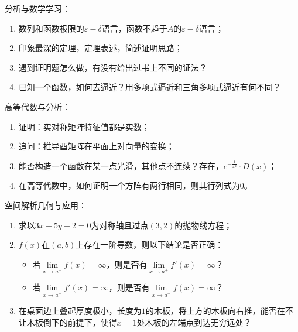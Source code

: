 \begin{example}[问题组4]分析与数学学习：
\begin{enumerate}
    \item 数列和函数极限的$\varepsilon-\delta$语言，函数不趋于$A$的$\varepsilon-\delta$语言；
    \item 印象最深的定理，定理表述，简述证明思路；
    \item 遇到证明题怎么做，有没有给出过书上不同的证法？
    \item 已知一个函数，如何去逼近？用多项式逼近和三角多项式逼近有何不同？
\end{enumerate}
\end{example}

\begin{example}[问题组5]高等代数与分析：
\begin{enumerate}
    \item 证明：实对称矩阵特征值都是实数；
    \item 追问：推导酉矩阵在平面上对向量的变换；
    \item 能否构造一个函数在某一点光滑，其他点不连续？存在，$e^{-\frac{1}{x^2}}\cdot D(x)$；
    \item 在高等代数中，如何证明一个方阵有两行相同，则其行列式为$0$。
\end{enumerate}
\end{example}

\begin{example}[问题组6]空间解析几何与应用：
\begin{enumerate}
    \item 求以$3x-5y+2=0$为对称轴且过点$(3,2)$的抛物线方程；
    \item $f(x)$在$(a,b)$上存在一阶导数，则以下结论是否正确：
    \begin{itemize}
        \item 若$\lim\limits_{x\to a^+}f(x)=\infty$，则是否有$\lim\limits_{x\to a^+}f'(x)=\infty$？
        \item 若$\lim\limits_{x\to a^+}f'(x)=\infty$，则是否有$\lim\limits_{x\to a^+}f(x)=\infty$？
    \end{itemize}
    \item 在桌面边上叠起厚度极小，长度为$1$的木板，将上方的木板向右推，能否在不让木板倒下的前提下，使得$x=1$处木板的左端点到达无穷远处？
\end{enumerate}
\end{example}